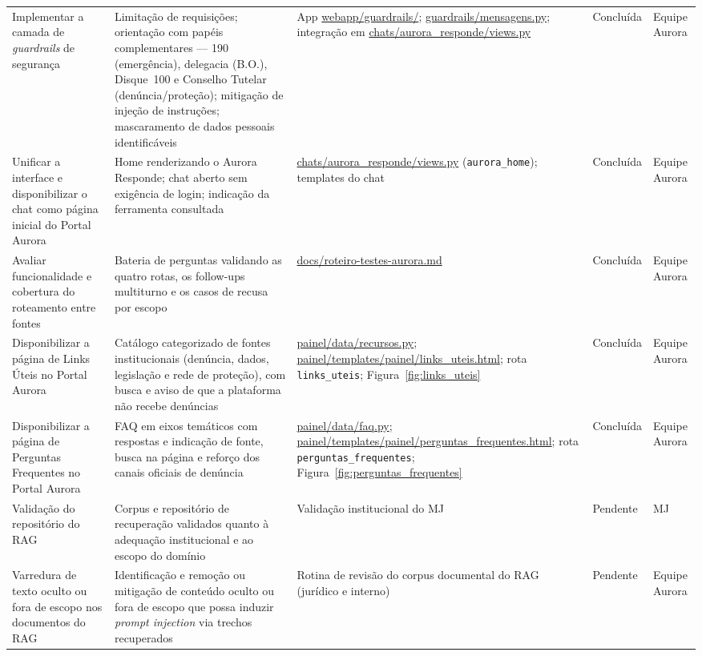 \documentclass[11pt,a4paper]{article}
\begin{document}
\begin{longtable}{@{}P{2.8cm}P{3.2cm}P{3.0cm}P{2.0cm}P{2.2cm}@{}}
Implementar a camada de \textit{guardrails} de segurança &
Limitação de requisições; orientação com papéis complementares — 190 (emergência), delegacia (B.O.), Disque~100 e Conselho Tutelar (denúncia/proteção); mitigação de injeção de instruções; mascaramento de dados pessoais identificáveis &
App \url{webapp/guardrails/}; \url{guardrails/mensagens.py}; integração em \url{chats/aurora_responde/views.py} &
Concluída &
Equipe Aurora \\

Unificar a interface e disponibilizar o chat como página inicial do Portal Aurora &
Home renderizando o Aurora Responde; chat aberto sem exigência de login; indicação da ferramenta consultada &
\url{chats/aurora_responde/views.py} (\texttt{aurora\_home}); templates do chat &
Concluída &
Equipe Aurora \\

Avaliar funcionalidade e cobertura do roteamento entre fontes &
Bateria de perguntas validando as quatro rotas, os follow-ups multiturno e os casos de recusa por escopo &
\url{docs/roteiro-testes-aurora.md} &
Concluída &
Equipe Aurora \\

Disponibilizar a página de Links Úteis no Portal Aurora &
Catálogo categorizado de fontes institucionais (denúncia, dados, legislação e rede de proteção), com busca e aviso de que a plataforma não recebe denúncias &
\url{painel/data/recursos.py}; \url{painel/templates/painel/links_uteis.html}; rota \texttt{links\_uteis}; Figura~\ref{fig:links_uteis} &
Concluída &
Equipe Aurora \\

Disponibilizar a página de Perguntas Frequentes no Portal Aurora &
FAQ em eixos temáticos com respostas e indicação de fonte, busca na página e reforço dos canais oficiais de denúncia &
\url{painel/data/faq.py}; \url{painel/templates/painel/perguntas_frequentes.html}; rota \texttt{perguntas\_frequentes}; Figura~\ref{fig:perguntas_frequentes} &
Concluída &
Equipe Aurora \\

Validação do repositório do RAG &
Corpus e repositório de recuperação validados quanto à adequação institucional e ao escopo do domínio &
Validação institucional do MJ &
Pendente &
MJ \\

Varredura de texto oculto ou fora de escopo nos documentos do RAG &
Identificação e remoção ou mitigação de conteúdo oculto ou fora de escopo que possa induzir \textit{prompt injection} via trechos recuperados &
Rotina de revisão do corpus documental do RAG (jurídico e interno) &
Pendente &
Equipe Aurora \\

\end{longtable}
\endgroup
\end{document}
